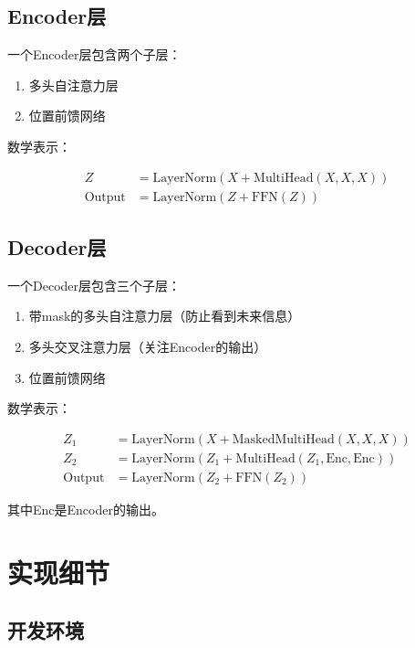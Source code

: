 \documentclass[UTF8,12pt,a4paper]{ctexart}
\begin{document}
\subsection{Encoder层}

一个Encoder层包含两个子层：

\begin{enumerate}
    \item 多头自注意力层
    \item 位置前馈网络
\end{enumerate}

数学表示：

\begin{align}
Z &= \text{LayerNorm}(X + \text{MultiHead}(X, X, X)) \\
\text{Output} &= \text{LayerNorm}(Z + \text{FFN}(Z))
\end{align}

\subsection{Decoder层}

一个Decoder层包含三个子层：

\begin{enumerate}
    \item 带mask的多头自注意力层（防止看到未来信息）
    \item 多头交叉注意力层（关注Encoder的输出）
    \item 位置前馈网络
\end{enumerate}

数学表示：

\begin{align}
Z_1 &= \text{LayerNorm}(X + \text{MaskedMultiHead}(X, X, X)) \\
Z_2 &= \text{LayerNorm}(Z_1 + \text{MultiHead}(Z_1, \text{Enc}, \text{Enc})) \\
\text{Output} &= \text{LayerNorm}(Z_2 + \text{FFN}(Z_2))
\end{align}

其中Enc是Encoder的输出。

\section{实现细节}

\subsection{开发环境}
\end{document}
